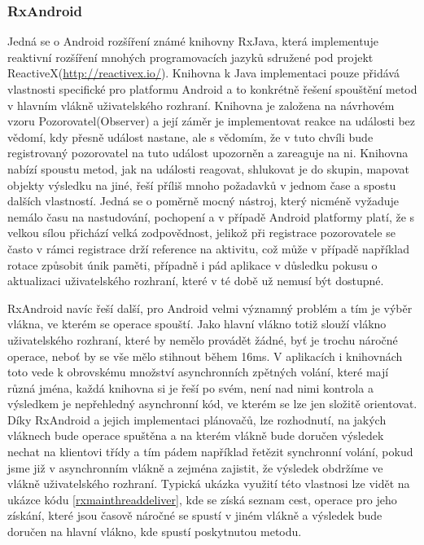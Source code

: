 \documentclass{article}
\begin{document}
\subsubsection{RxAndroid}\label{rxandroid}
Jedná se o Android rozšíření známé knihovny RxJava, která implementuje reaktivní rozšíření
mnohých programovacích jazyků sdružené pod projekt ReactiveX(\url{http://reactivex.io/}).
Knihovna k Java implementaci pouze přidává vlastnosti specifické pro platformu Android a to konkrétně
řešení spouštění metod v hlavním vlákně uživatelského rozhraní. Knihovna je založena na návrhovém
vzoru Pozorovatel(Observer) a její záměr je implementovat reakce na události bez vědomí, kdy přesně
událost nastane, ale s vědomím, že v tuto chvíli bude registrovaný pozorovatel na tuto událost
upozorněn a zareaguje na ni. Knihovna nabízí spoustu metod, jak na události reagovat, shlukovat je do
skupin, mapovat objekty výsledku na jiné, řeší příliš mnoho požadavků v jednom čase a spostu dalších vlastností.
Jedná se o poměrně mocný nástroj, který nicméně vyžaduje nemálo času na nastudování, pochopení a v případě
Android platformy platí, že s velkou sílou přichází velká zodpovědnost, jelikož při registrace pozorovatele
se často v rámci registrace drží reference na aktivitu, což může v případě například rotace způsobit únik paměti,
případně i pád aplikace v důsledku pokusu o aktualizaci uživatelského rozhraní, které v té době už nemusí být dostupné.

RxAndroid navíc řeší další, pro Android velmi významný problém a tím je výběr vlákna, ve kterém se
operace spouští. Jako hlavní vlákno totiž slouží vlákno uživatelského rozhraní, které by
nemělo provádět žádné, byť je trochu náročné operace, neboť by se vše mělo stihnout během 16ms\cite{perf}.
V aplikacích i knihovnách toto vede k obrovskému množství asynchronních zpětných volání, které mají různá jména,
každá knihovna si je řeší po svém, není nad nimi kontrola a výsledkem je nepřehledný asynchronní kód,
ve kterém se lze jen složitě orientovat. Díky RxAndroid a jejich implementaci plánovačů, lze rozhodnutí,
na jakých vláknech bude operace spuštěna a na kterém vlákně bude doručen výsledek nechat na klientovi třídy
a tím pádem například řetězit synchronní volání, pokud jsme již v asynchronním vlákně a zejména zajistit,
že výsledek obdržíme ve vlákně uživatelského rozhraní. Typická ukázka využití této vlastnosi
lze vidět na ukázce kódu \ref{rxmainthreaddeliver}, kde se získá seznam cest, operace pro jeho získání,
které jsou časově náročné se spustí v jiném vlákně a výsledek bude doručen na hlavní vlákno,
kde spustí poskytnutou metodu.
\end{document}
